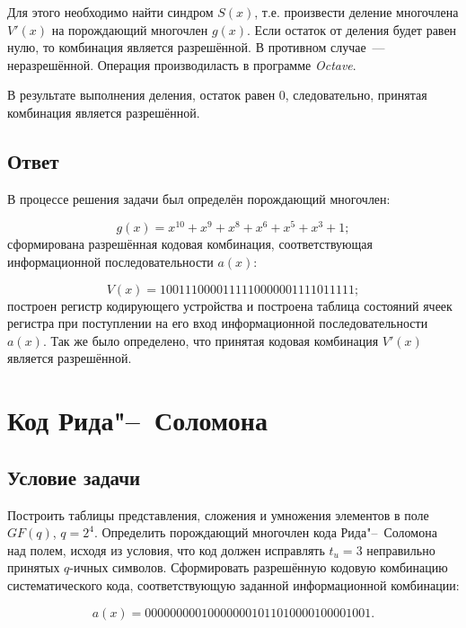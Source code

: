 Для этого необходимо найти синдром $S(x)$, т.е.  произвести деление
многочлена $V'(x)$ на порождающий многочлен $g(x)$. Если остаток от
деления будет равен нулю, то комбинация является разрешённой.  В
противном случае~--- неразрешённой. Операция производиласть в
программе \textit{Octave}.

В результате выполнения деления, остаток равен 0, следовательно,
принятая комбинация является разрешённой.

\subsection{Ответ}

В процессе решения задачи был определён порождающий многочлен:

\begin{equation*}
g(x) = x^{10} + x^9 + x^8 + x^6 + x^5 + x^3 + 1;
\end{equation*}
сформирована разрешённая кодовая комбинация, соответствующая
информационной последовательности $a(x)$:

\begin{equation*}
V(x) = 1001110000111110000001111011111;
\end{equation*}
построен регистр кодирующего устройства и построена таблица состояний
ячеек регистра при поступлении на его вход информационной
последовательности $a(x)$. Так же было определено, что принятая кодовая
комбинация $V'(x)$ является разрешённой.
\newpage

\section{Код Рида"--~Соломона}
\label{sec:Reed-Solomon}

\subsection{Условие задачи}

Построить таблицы представления, сложения и умножения элементов в поле
$GF(q)$, $q = 2^4$. Определить порождающий многочлен кода
Рида"--~Соломона над полем, исходя из условия, что код должен
исправлять $t_u = 3$ неправильно принятых $q$-ичных
символов. Сформировать разрешённую кодовую комбинацию систематического
кода, соответствующую заданной информационной комбинации:

\begin{equation*}
  a(x) = 000000000100000001011010000100001001.
\end{equation*}

